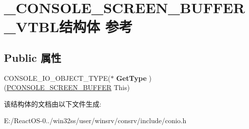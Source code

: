 \hypertarget{struct___c_o_n_s_o_l_e___s_c_r_e_e_n___b_u_f_f_e_r___v_t_b_l}{}\section{\+\_\+\+C\+O\+N\+S\+O\+L\+E\+\_\+\+S\+C\+R\+E\+E\+N\+\_\+\+B\+U\+F\+F\+E\+R\+\_\+\+V\+T\+B\+L结构体 参考}
\label{struct___c_o_n_s_o_l_e___s_c_r_e_e_n___b_u_f_f_e_r___v_t_b_l}
\subsection*{Public 属性}
\begin{DoxyCompactItemize}
\item 
\mbox{\label{struct___c_o_n_s_o_l_e___s_c_r_e_e_n___b_u_f_f_e_r___v_t_b_l_a83bb3015d589e94709259ba11667f110}} 
C\+O\+N\+S\+O\+L\+E\+\_\+\+I\+O\+\_\+\+O\+B\+J\+E\+C\+T\+\_\+\+T\+Y\+PE($\ast$ {\bfseries Get\+Type} )(\hyperlink{struct___c_o_n_s_o_l_e___s_c_r_e_e_n___b_u_f_f_e_r}{P\+C\+O\+N\+S\+O\+L\+E\+\_\+\+S\+C\+R\+E\+E\+N\+\_\+\+B\+U\+F\+F\+ER} This)
\end{DoxyCompactItemize}


该结构体的文档由以下文件生成\+:\begin{DoxyCompactItemize}
\item 
E\+:/\+React\+O\+S-\/0../win32ss/user/winsrv/consrv/include/conio.\+h\end{DoxyCompactItemize}
